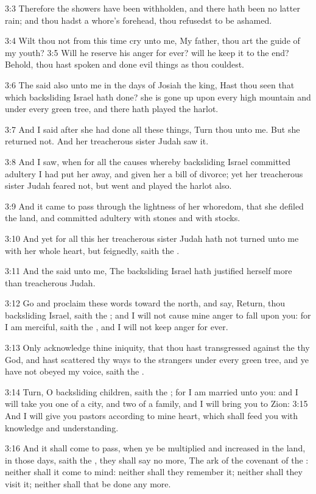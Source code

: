 3:3 Therefore the showers have been withholden, and there hath been no latter rain; and thou hadst a whore's forehead, thou refusedst to be ashamed.

3:4 Wilt thou not from this time cry unto me, My father, thou art the guide of my youth?  3:5 Will he reserve his anger for ever? will he keep it to the end?  Behold, thou hast spoken and done evil things as thou couldest.

3:6 The \LORD said also unto me in the days of Josiah the king, Hast thou seen that which backsliding Israel hath done? she is gone up upon every high mountain and under every green tree, and there hath played the harlot.

3:7 And I said after she had done all these things, Turn thou unto me.  But she returned not. And her treacherous sister Judah saw it.

3:8 And I saw, when for all the causes whereby backsliding Israel committed adultery I had put her away, and given her a bill of divorce; yet her treacherous sister Judah feared not, but went and played the harlot also.

3:9 And it came to pass through the lightness of her whoredom, that she defiled the land, and committed adultery with stones and with stocks.

3:10 And yet for all this her treacherous sister Judah hath not turned unto me with her whole heart, but feignedly, saith the \LORD.

3:11 And the \LORD said unto me, The backsliding Israel hath justified herself more than treacherous Judah.

3:12 Go and proclaim these words toward the north, and say, Return, thou backsliding Israel, saith the \LORD; and I will not cause mine anger to fall upon you: for I am merciful, saith the \LORD, and I will not keep anger for ever.

3:13 Only acknowledge thine iniquity, that thou hast transgressed against the \LORD thy God, and hast scattered thy ways to the strangers under every green tree, and ye have not obeyed my voice, saith the \LORD.

3:14 Turn, O backsliding children, saith the \LORD; for I am married unto you: and I will take you one of a city, and two of a family, and I will bring you to Zion: 3:15 And I will give you pastors according to mine heart, which shall feed you with knowledge and understanding.

3:16 And it shall come to pass, when ye be multiplied and increased in the land, in those days, saith the \LORD, they shall say no more, The ark of the covenant of the \LORD: neither shall it come to mind: neither shall they remember it; neither shall they visit it; neither shall that be done any more.

